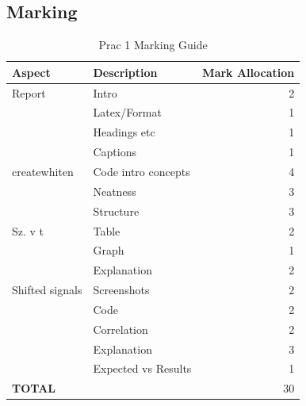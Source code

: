 \subsection{Marking}
\begin{table}[H]
\centering
\caption{Prac 1 Marking Guide}
\label{tbl:Prac1Marks}
\begin{tabular}{|l|l|r|}
\hline
\textbf{Aspect} & \textbf{Description} & \multicolumn{1}{l|}{\textbf{Mark Allocation}} \\ \hline
Report & Intro & 2 \\ \hline
 & Latex/Format & 1 \\ \hline
 & Headings etc & 1 \\ \hline
 & Captions & 1 \\ \hline
createwhiten & Code intro concepts & 4 \\ \hline
 & Neatness & 3 \\ \hline
 & Structure & 3 \\ \hline
Sz. v t & Table & 2 \\ \hline
 & Graph & 1 \\ \hline
 & Explanation & 2 \\ \hline
Shifted signals & Screenshots & 2 \\ \hline
 & Code & 2 \\ \hline
 & Correlation & 2 \\ \hline
 & Explanation & 3 \\ \hline
 & Expected vs Results & 1 \\ \hline
\textbf{TOTAL} &  & 30 \\ \hline
\end{tabular}
\end{table}


